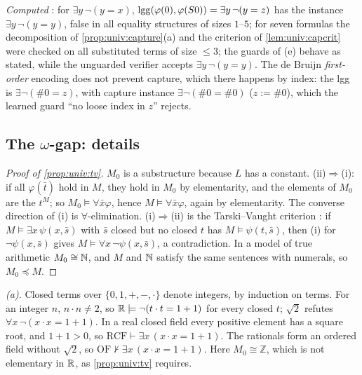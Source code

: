 \emph{Computed} : for $\exists y\,\neg(y=x)$, $\mathrm{lgg}(\varphi(0),\varphi(S0))=\exists y\,\neg(y=z)$ has the instance $\exists y\,\neg(y=y)$, false in all equality structures of sizes $1$--$5$; for seven formulas the decomposition of \cref{prop:univ:capture}(a) and the criterion of \cref{lem:univ:capcrit} were checked on all substituted terms of size $\le3$; the guards of (e) behave as stated, while the unguarded verifier accepts $\exists y\,\neg(y=y)$. The de Bruijn \emph{first-order} encoding does not prevent capture, which there happens by index: the lgg is $\exists\neg(\#0=z)$, with capture instance $\exists\neg(\#0=\#0)$ ($z:=\#0$), which the learned guard ``no loose index in $z$'' rejects.

\subsection{The \texorpdfstring{$\omega$}{omega}-gap: details}\label{app:univ:omega}

\begin{proof}[Proof of \cref{prop:univ:tv}]
$M_0$ is a substructure because $L$ has a constant. (ii)$\Rightarrow$(i): if all $\varphi(\bar t)$ hold in $M$, they hold in $M_0$ by elementarity, and the elements of $M_0$ are the $t^M$; so $M_0\models\forall\bar x\varphi$, hence $M\models\forall\bar x\varphi$, again by elementarity. The converse direction of (i) is $\forall$-elimination. (i)$\Rightarrow$(ii) is the Tarski--Vaught criterion \citep{tarski1957arithmetical}: if $M\models\exists x\,\psi(x,\bar s)$ with $\bar s$ closed but no closed $t$ has $M\models\psi(t,\bar s)$, then (i) for $\neg\psi(x,\bar s)$ gives $M\models\forall x\,\neg\psi(x,\bar s)$, a contradiction. In a model of true arithmetic $M_0\cong\mathbb{N}$, and $M$ and $\mathbb{N}$ satisfy the same sentences with numerals, so $M_0\preceq M$.
\end{proof}

\emph{(a).} Closed terms over $\{0,1,+,-,\cdot\}$ denote integers, by induction on terms. For an integer $n$, $n\cdot n\neq2$, so $\mathbb{R}\models\neg(t\cdot t=1+1)$ for every closed $t$; $\sqrt2$ refutes $\forall x\,\neg(x\cdot x=1+1)$. In a real closed field every positive element has a square root, and $1+1>0$, so $\mathrm{RCF}\vdash\exists x\,(x\cdot x=1+1)$. The rationals form an ordered field without $\sqrt2$, so $\mathrm{OF}\nvdash\exists x\,(x\cdot x=1+1)$. Here $M_0\cong\mathbb Z$, which is not elementary in $\mathbb{R}$, as \cref{prop:univ:tv} requires.


